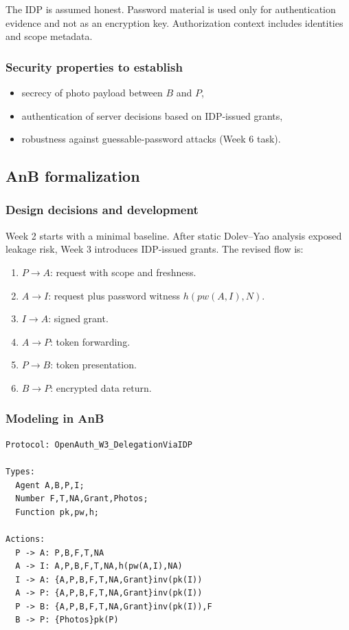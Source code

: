 \documentclass[11pt,a4paper]{article}
\begin{document}
The IDP is assumed honest.
Password material is used only for authentication evidence and not as an encryption key.
Authorization context includes identities and scope metadata.

\subsubsection{Security properties to establish}
\begin{itemize}
  \item secrecy of photo payload between $B$ and $P$,
  \item authentication of server decisions based on IDP-issued grants,
  \item robustness against guessable-password attacks (Week 6 task).
\end{itemize}

\subsection{AnB formalization}

\subsubsection{Design decisions and development}
Week 2 starts with a minimal baseline.
After static Dolev--Yao analysis exposed leakage risk, Week 3 introduces IDP-issued grants.
The revised flow is:
\begin{enumerate}
  \item $P \rightarrow A$: request with scope and freshness.
  \item $A \rightarrow I$: request plus password witness $h(pw(A,I),N)$.
  \item $I \rightarrow A$: signed grant.
  \item $A \rightarrow P$: token forwarding.
  \item $P \rightarrow B$: token presentation.
  \item $B \rightarrow P$: encrypted data return.
\end{enumerate}

\subsubsection{Modeling in AnB}
\begin{lstlisting}
Protocol: OpenAuth_W3_DelegationViaIDP

Types:
  Agent A,B,P,I;
  Number F,T,NA,Grant,Photos;
  Function pk,pw,h;

Actions:
  P -> A: P,B,F,T,NA
  A -> I: A,P,B,F,T,NA,h(pw(A,I),NA)
  I -> A: {A,P,B,F,T,NA,Grant}inv(pk(I))
  A -> P: {A,P,B,F,T,NA,Grant}inv(pk(I))
  P -> B: {A,P,B,F,T,NA,Grant}inv(pk(I)),F
  B -> P: {Photos}pk(P)
\end{lstlisting}
\end{document}
